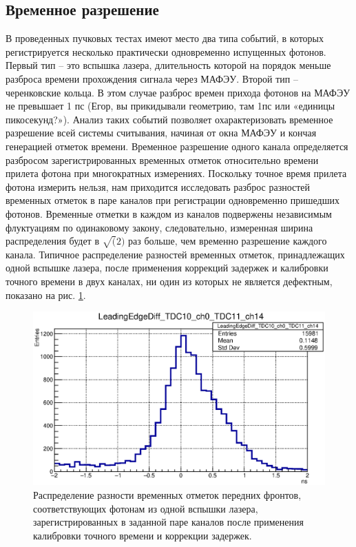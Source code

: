 \subsection{Временное разрешение}\label{section:TimeRes}

В проведенных пучковых тестах имеют место два типа событий, в которых регистрируется несколько практически одновременно испущенных фотонов. Первый тип – это вспышка лазера, длительность которой на порядок меньше разброса времени прохождения сигнала через МАФЭУ. Второй тип – черенковские кольца. В этом случае разброс времен прихода фотонов на МАФЭУ не превышает 1 пс (Егор, вы прикидывали геометрию, там 1пс или «единицы пикосекунд?»). Анализ таких событий позволяет охарактеризовать временное разрешение всей системы считывания, начиная от окна МАФЭУ и кончая генерацией отметок времени. Временное разрешение одного канала определяется разбросом зарегистрированных временных отметок относительно времени прилета фотона при многократных измерениях. Поскольку точное время прилета фотона измерить нельзя, нам приходится исследовать разброс разностей временных отметок в паре каналов при регистрации одновременно пришедших фотонов. Временные отметки в каждом из каналов подвержены независимым флуктуациям по одинаковому закону, следовательно, измеренная ширина распределения будет в $ \sqrt(2) $ раз больше, чем временно разрешение каждого канала. Типичное распределение разностей временных отметок, принадлежащих одной вспышке лазера, после применения коррекций задержек и калибровки точного времени в двух каналах, ни один из которых не является дефектным, показано на рис. \ref{fig:TimeRes}.

\begin{figure}
\includegraphics[width=1.0\textwidth]{pictures/LeadingEdgeDiff_TDC10_ch0_TDC11_ch14_corr.eps}
\caption{Распределение разности временных отметок передних фронтов, соответствующих фотонам из одной вспышки лазера, зарегистрированных в заданной паре каналов после применения калибровки точного времени и коррекции задержек.}
\label{fig:TimeRes}
\end{figure}

